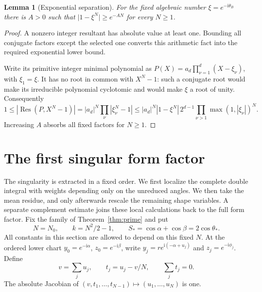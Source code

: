 \documentclass[11pt]{article}
\numberwithin{equation}{section}
\newtheorem{lemma}[theorem]{Lemma}
\theoremstyle{definition}
\newcommand{\ii}{\mathrm i}
\newcommand{\Res}{\operatorname{Res}}
\begin{document}
\begin{lemma}[Exponential separation]\label{lem:resultant}
For the fixed algebraic number \(\xi=e^{-\ii\theta_B}\) there is
\(A>0\) such that \(\lvert1-\xi^N\rvert\ge e^{-AN}\) for every \(N\ge1\).
\end{lemma}
\begin{proof}
A nonzero integer resultant has absolute value at least one. Bounding all conjugate factors except the selected one converts this arithmetic fact into the required exponential lower bound.

Write its primitive integer minimal polynomial as
\(P(X)=a_d\prod_{\nu=1}^d(X-\xi_\nu)\), with \(\xi_1=\xi\).
It has no root in common with \(X^N-1\): such a conjugate root would make
its irreducible polynomial cyclotomic and would make \(\xi\) a root of
unity. Consequently
\[
 1\le |\Res(P,X^N-1)|
 =|a_d|^N\prod_\nu|\xi_\nu^N-1|
 \le |a_d|^N|1-\xi^N|\,2^{d-1}
       \prod_{\nu>1}\max(1,|\xi_\nu|)^N.
\]
Increasing \(A\) absorbs all fixed factors for \(N\ge1\).
\end{proof}



\section{The first singular form factor}
\label{sec:first}

The singularity is extracted in a fixed order. We first localize the
complete double integral with weights depending only on the unreduced
angles. We then take the mean residue, and only afterwards rescale the
remaining shape variables. A separate complement estimate joins these
local calculations back to the full form factor.
Fix the family of Theorem~\ref{thm:prime} and put
\[
 N=N_0,\qquad k=N^2/2-1,\qquad
 S_*=\cos\alpha+\cos\beta=2\cos\theta_*.
\]
All constants in this section are allowed to depend on this fixed \(N\).
At the ordered lower chart \(y_0=e^{-\ii\alpha}\),
\(z_0=e^{-\ii\beta}\), write \(y_j=r e^{\ii(-\alpha+u_j)}\) and
\(z_j=e^{-\ii\phi_j}\). Define
\[
 v=\sum_j u_j,\qquad t_j=u_j-v/N,\qquad \sum_jt_j=0.
\]
The absolute Jacobian of \((v,t_1,\ldots,t_{N-1})\mapsto(u_1,\ldots,u_N)\)
is one.
\end{document}
